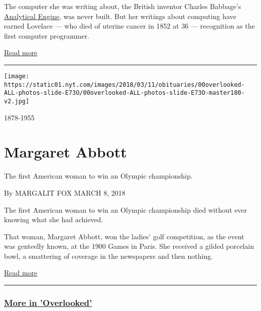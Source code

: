 The computer she was writing about, the British inventor Charles
Babbage's
\href{http://www.nytimes.com/interactive/2011/11/07/science/before-its-time-machine.html}{Analytical
Engine}, was never built. But her writings about computing have earned
Lovelace --- who died of uterine cancer in 1852 at 36 --- recognition as
the first computer programmer.

\href{https://www.nytimes.com/interactive/2018/obituaries/overlooked-ada-lovelace.html}{Read
more}

\begin{center}\rule{0.5\linewidth}{\linethickness}\end{center}

\texttt{[image: https://static01.nyt.com/images/2018/03/11/obituaries/00overlooked-ALL-photos-slide-E73O/00overlooked-ALL-photos-slide-E73O-master180-v2.jpg]}

1878-1955

\hypertarget{margaret-abbott}{%
\section{Margaret Abbott}\label{margaret-abbott}}

The first American woman to win an Olympic championship.

By MARGALIT FOX MARCH 8, 2018

The first American woman to win an Olympic championship died without
ever knowing what she had achieved.

That woman, Margaret Abbott, won the ladies' golf competition, as the
event was genteelly known, at the 1900 Games in Paris. She received a
gilded porcelain bowl, a smattering of coverage in the newspapers and
then nothing.

\href{https://www.nytimes.com/interactive/2018/obituaries/overlooked-margaret-abbott.html}{Read
more}

\begin{center}\rule{0.5\linewidth}{\linethickness}\end{center}

\hypertarget{more-in-overlooked}{%
\subsubsection{\texorpdfstring{\href{https://www.nytimes.com/spotlight/overlooked}{More
in 'Overlooked'}}{More in 'Overlooked'}}\label{more-in-overlooked}}

